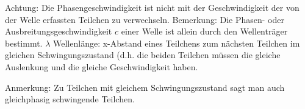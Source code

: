 	Achtung: Die Phasengeschwindigkeit ist nicht
	mit der Geschwindigkeit der von der Welle erfassten Teilchen zu verwechseln.
	\eTD 
\eTR
\bTR
	\bTD [nc=2,rightframe=on] 
	Bemerkung: Die Phasen- oder Ausbreitungsgeschwindigkeit $c$ einer Welle ist
	allein durch den Wellenträger bestimmt.
	\eTD 
\eTR
\bTR \bTD $\lambda$ \eTD 
	\bTD 
	Wellenlänge: x-Abstand eines Teilchens zum nächsten Teilchen im gleichen
	Schwingungszustand (d.h. die beiden Teilchen müssen die gleiche Auslenkung und
	die gleiche Geschwindigkeit haben.

	Anmerkung: Zu Teilchen mit gleichem
	Schwingungszustand sagt man auch gleichphasig schwingende Teilchen.
	\eTD 
\eTR

\eTABLE
\stopplacetable

\stopframedtext %

